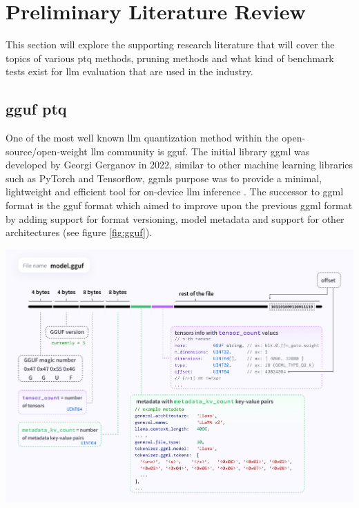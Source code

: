 \documentclass{ifacconf}
\begin{document}
	
	\section{Preliminary Literature Review}
	This section will explore the supporting research literature that will cover the topics of various \gls{ptq} methods, pruning methods and what kind of benchmark tests exist for \gls{llm} evaluation that are used in the industry. 
	
	\subsection{\gls{gguf} \gls{ptq}}
	
	One of the most well known \gls{llm} quantization method within the open-source/open-weight \gls{llm} community is \gls{gguf}. The initial library \gls{ggml} was developed by Georgi Gerganov in 2022, similar to other machine learning libraries such as PyTorch and Tensorflow, \glspl{ggml} purpose was to provide a minimal, lightweight and efficient tool for on-device \gls{llm} inference \cite{ggmlhuggingface}. The successor to \gls{ggml} format is the \gls{gguf} format which aimed to improve upon the previous \gls{ggml} format by adding support for format versioning, model metadata and support for other architectures \cite{ggmlgithubdocs} (see figure \ref{fig:gguf}).
	\\
	\begin{strip}
		\begin{minipage}{\textwidth}\centering
			\includegraphics[width=\linewidth, height=0.45\textheight]{gguf}
			\label{fig:gguf}
		\end{minipage}
	\end{strip}
	
\end{document}
